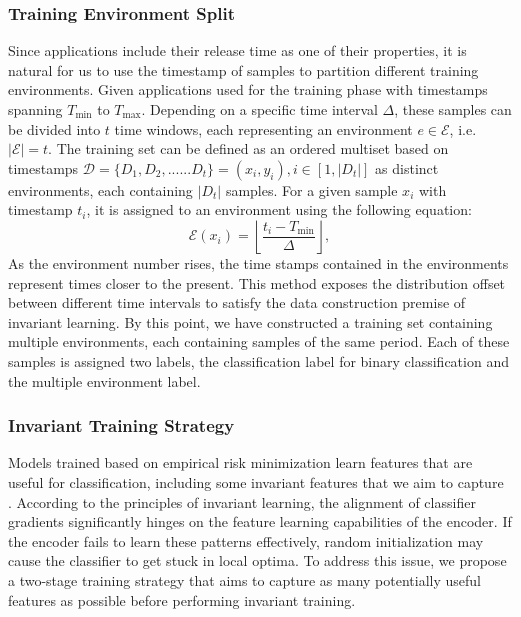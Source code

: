 \subsubsection{Training Environment Split}
Since applications include their release time as one of their properties, it is natural for us to use the timestamp of samples to partition different training environments. Given applications used for the training phase with timestamps spanning $T_{\min}$ to $T_{\max}$. Depending on a specific time interval $\Delta$, these samples can be divided into $t$ time windows, each representing an environment $e \in \mathcal{E}$, i.e. $|\mathcal{E}| = t$. The training set can be defined as an ordered multiset based on timestamps $\mathcal{D} = \{D_1,D_2, ...... D_t\} = (x_i, y_i), i \in [1,|D_t|]$ as distinct environments, each containing $|D_t|$ samples. For a given sample $x_i$ with timestamp $t_i$, it is assigned to an environment using the following equation:
\begin{equation}
\mathcal{E}(x_i)=\left\lfloor\frac{t_i-T_{\min }}{\Delta}\right\rfloor,
\end{equation}
As the environment number rises, the time stamps contained in the environments represent times closer to the present. This method exposes the distribution offset between different time intervals to satisfy the data construction premise of invariant learning. By this point, we have constructed a training set containing multiple environments, each containing samples of the same period. Each of these samples is assigned two labels, the classification label for binary classification and the multiple environment label. 

\subsubsection{Invariant Training Strategy}
Models trained based on empirical risk minimization learn features that are useful for classification, including some invariant features that we aim to capture \cite{FAT}. According to the principles of invariant learning, the alignment of classifier gradients significantly hinges on the feature learning capabilities of the encoder. If the encoder fails to learn these patterns effectively, random initialization may cause the classifier to get stuck in local optima. To address this issue, we propose a two-stage training strategy that aims to capture as many potentially useful features as possible before performing invariant training.

